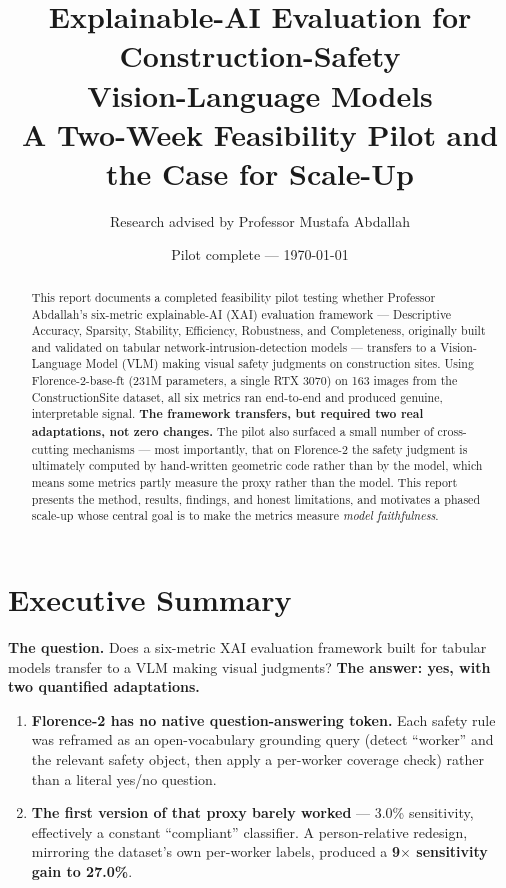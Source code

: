 \documentclass[11pt]{article}
\title{\vspace{-1.5cm}\textbf{Explainable-AI Evaluation for Construction-Safety\\Vision-Language Models}\\[0.3cm]
\large A Two-Week Feasibility Pilot and the Case for Scale-Up}
\author{Research advised by Professor Mustafa Abdallah}
\date{Pilot complete --- \today}
\begin{document}
\maketitle
\vspace{-0.8cm}

\begin{abstract}
\noindent This report documents a completed feasibility pilot testing whether Professor Abdallah's
six-metric explainable-AI (XAI) evaluation framework --- Descriptive Accuracy, Sparsity, Stability,
Efficiency, Robustness, and Completeness, originally built and validated on tabular
network-intrusion-detection models --- transfers to a Vision-Language Model (VLM) making visual
safety judgments on construction sites. Using Florence-2-base-ft (231M parameters, a single RTX 3070)
on 163 images from the ConstructionSite dataset, all six metrics ran end-to-end and produced genuine,
interpretable signal. \textbf{The framework transfers, but required two real adaptations, not zero
changes.} The pilot also surfaced a small number of cross-cutting mechanisms --- most importantly, that
on Florence-2 the safety judgment is ultimately computed by hand-written geometric code rather than by
the model, which means some metrics partly measure the proxy rather than the model. This report
presents the method, results, findings, and honest limitations, and motivates a phased scale-up whose
central goal is to make the metrics measure \emph{model faithfulness}.
\end{abstract}

\section{Executive Summary}

\textbf{The question.} Does a six-metric XAI evaluation framework built for tabular models transfer to
a VLM making visual judgments? \textbf{The answer: yes, with two quantified adaptations.}

\begin{enumerate}[leftmargin=*,itemsep=2pt]
\item \textbf{Florence-2 has no native question-answering token.} Each safety rule was reframed as an
open-vocabulary grounding query (detect ``worker'' and the relevant safety object, then apply a
per-worker coverage check) rather than a literal yes/no question.
\item \textbf{The first version of that proxy barely worked} --- 3.0\% sensitivity, effectively a
constant ``compliant'' classifier. A person-relative redesign, mirroring the dataset's own per-worker
labels, produced a \textbf{9$\times$ sensitivity gain to 27.0\%}.
\end{enumerate}
\end{document}
